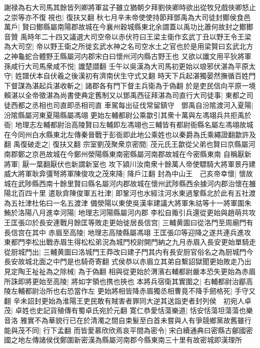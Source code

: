 謝禄為右大司馬其餘皆列卿將軍盆子雖立猶朝夕拜劉俠卿時欲出從牧兒戲俠卿怒止之崇等亦不復視也|{
	復扶又翻}
秋七月辛未帝使使持節拜鄧禹為大司徒封鄼侯食邑萬戶|{
	賢曰鄼縣屬南陽郡故城在今襄州穀城縣東北余謂蓋以禹功比蕭何故封之鄼鄼音贊}
禹時年二十四又議選大司空帝以赤伏符曰王梁主衛作玄武丁丑以野王令王梁為大司空|{
	帝以野王衛之所徙玄武水神之名司空水土之官也於是用梁賢曰玄武北方之神龜蛇合體野王縣屬河内郡宋白曰懷州河内縣古野王也}
又欲以䜟文用平狄將軍孫咸行大司馬衆咸不悦|{
	䜟楚譛翻}
壬午以吳漢為大司馬初更始以琅邪伏湛為平原太守|{
	姓譜伏本自伏羲之後漢初有濟南伏生守式又翻}
時天下兵起湛獨晏然撫循百姓門下督謀為湛起兵湛收斬之|{
	諸郡各有門下督主兵衛為于偽翻}
於是吏民信向平原一境賴湛以全帝徵湛為尚書使典定舊制又以鄧禹西征拜湛為司直行大司徒事|{
	東都之司徒西都之丞相也司直即丞相司直}
車駕每出征伐常留鎮守　鄧禹自汾隂渡河入夏陽|{
	汾隂縣屬河東夏陽縣屬馮翊}
更始左輔都尉公乘歙引其衆十萬與左馮翊兵共拒禹於衙|{
	地理志左輔都尉治高陵賢曰左輔即左馮翊也三輔皆有都尉衙縣名屬左馮翊故城在今同州白水縣東北左傳秦晉戰于彭衙即此地公乘姓也以秦爵為氏乘繩證翻歙許及翻}
禹復破走之|{
	復扶又翻}
宗室劉茂聚衆京密間|{
	茂元氏王歙從父弟也賢曰京縣屬河南郡鄭之京邑故城在今鄭州滎陽縣東南密縣屬河南郡故城在今密縣東南}
自稱厭新將軍|{
	厭一葉翻厭伏也新謂新室也}
攻下潁川汝南衆十餘萬人帝使驃騎大將軍景丹建威大將軍耿弇彊弩將軍陳俊攻之茂來降|{
	降戶江翻}
封為中山王　己亥帝幸懷|{
	懷故城在武陟縣西南十餘里賢曰縣名屬河内郡故城在懷州武陟縣西余據河内郡治懷在雒陽北百四十里}
遣耿弇陳俊軍五社津|{
	即鞏河也水經注河水東過鞏縣北於此有五社渡為五社津杜佑曰一名五渡津}
備滎陽以東使吳漢率建議大將軍朱祜等十一將軍圍朱鮪於洛陽八月進幸河陽|{
	地理志河陽縣屬河内郡}
李松自掫引兵還從更始與趙萌共攻王匡張卬於長安連戰月餘匡等敗走更始徙居長信宫|{
	三輔黄圖曰從洛門至周廟門有長信宫在其中}
赤眉至高陵|{
	地理志高陵縣屬馮翊}
王匡張卬等迎降之遂共連兵進攻東都門李松出戰赤眉生得松松弟況為城門校尉開門納之九月赤眉入長安更始單騎走從厨城門出|{
	三輔黄圖曰洛城門王莽改曰建子門其内有長安厨官俗名之為厨城門今長安故城北面之中門是也騎奇寄翻}
式侯恭以赤眉立其弟自繫詔獄聞更始敗走乃出見定陶王祉祉為之除械|{
	為于偽翻}
相與從更始於渭濱右輔都尉嚴本恐失更始為赤眉所誅即將更始至高陵|{
	將如字領也携也挾也}
本將兵宿衛其實圍之|{
	右輔都尉治郿高陵左輔都尉治所也右恐當作左}
更始將相皆降赤眉獨丞相曹竟不降手劒格死|{
	手守又翻}
辛未詔封更始為淮陽王吏民敢有賊害者罪同大逆其送詣吏者封列侯　初宛人卓茂|{
	卓姓也史記貨殖傳有蜀卓氏宛於元翻}
寛仁恭愛恬蕩樂道|{
	恬安恬蕩坦蕩蕩也樂音洛}
雅實不為華貌行已在於清濁之間自束髮至白首未嘗與人有爭競鄉黨故舊雖行能與茂不同|{
	行下孟翻}
而皆愛慕欣欣焉哀平間為密令|{
	宋白續通典曰密縣古鄶國密國之地左傳諸侯伐鄭圍新密漢為縣屬河南郡今縣東南三十里有故密城即漢理所}

